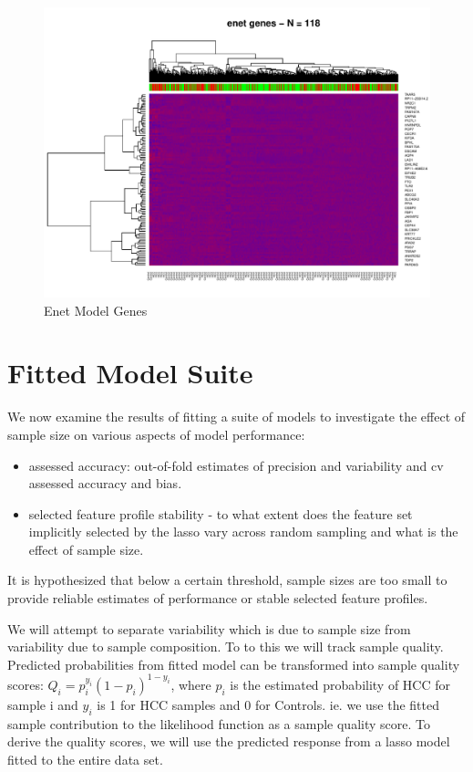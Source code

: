 \documentclass[
]{book}
\begin{document}
\begin{figure}
\centering
\includegraphics{Static/figures/heatmapEnet-1.pdf}
\caption{\label{fig:heatmapEnet}Enet Model Genes}
\end{figure}

\hypertarget{model-suite}{%
\chapter{Fitted Model Suite}\label{model-suite}}

We now examine the results of fitting a suite of models to
investigate the effect of sample size on
various aspects of model performance:

\begin{itemize}
\item
  assessed accuracy: out-of-fold estimates of precision and variability and
  cv assessed accuracy and bias.
\item
  selected feature profile stability - to what extent does the
  feature set implicitly selected by the lasso vary across random
  sampling and what is the effect of sample size.
\end{itemize}

It is hypothesized that below a certain threshold,
sample sizes are too small to provide reliable estimates
of performance or stable selected feature profiles.

We will attempt to separate variability which is due to
sample size from variability due to sample composition.
To to this we will track sample quality.
Predicted probabilities from fitted model can be transformed into sample
quality scores: \(Q_i = p_i^{y_i}(1-p_i)^{1-y_i}\), where \(p_i\) is the
estimated probability of HCC for sample i and \(y_i\) is 1 for HCC samples and
0 for Controls. ie. we use the fitted sample contribution to the
likelihood function as a sample quality score. To derive the quality scores,
we will use the predicted response from a lasso model fitted to the entire data set.
\end{document}

